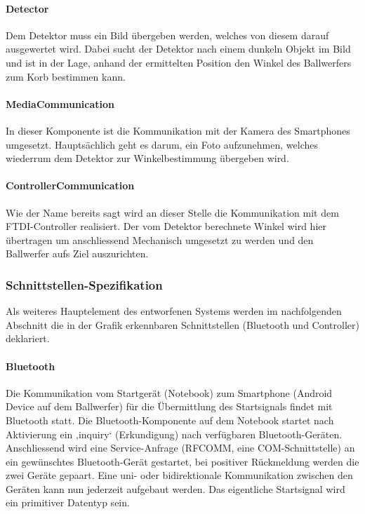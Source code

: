 		\paragraph{Detector}
		Dem Detektor muss ein Bild übergeben werden, welches von diesem darauf ausgewertet wird. Dabei sucht der Detektor nach einem dunkeln Objekt im Bild und ist in der Lage, anhand der ermittelten Position den Winkel des Ballwerfers zum Korb bestimmen kann.
		
		\paragraph{MediaCommunication}
		In dieser Komponente ist die Kommunikation mit der Kamera des Smartphones umgesetzt. Hauptsächlich geht es darum, ein Foto aufzunehmen, welches wiederrum dem Detektor zur Winkelbestimmung übergeben wird.
		
		\paragraph{ControllerCommunication}
		Wie der Name bereits sagt wird an dieser Stelle die Kommunikation mit dem FTDI-Controller realisiert. Der vom Detektor berechnete Winkel wird hier übertragen um anschliessend Mechanisch umgesetzt zu werden und den Ballwerfer aufs Ziel auszurichten.
		
	\subsubsection{Schnittstellen-Spezifikation}
		Als weiteres Hauptelement des entworfenen Systems werden im nachfolgenden Abschnitt die in der Grafik erkennbaren Schnittstellen (Bluetooth und Controller) deklariert.
		
		\paragraph{Bluetooth}
		Die Kommunikation vom Startgerät (Notebook) zum Smartphone (Android Device auf dem Ballwerfer) für die Übermittlung des Startsignals findet mit Bluetooth statt. Die Bluetooth-Komponente auf dem Notebook startet nach Aktivierung ein ‚inquiry‘ (Erkundigung) nach verfügbaren Bluetooth-Geräten. Anschliessend wird eine Service-Anfrage (RFCOMM, eine COM-Schnittstelle) an ein gewünschtes Bluetooth-Gerät gestartet, bei positiver Rückmeldung werden die zwei Geräte gepaart. Eine uni- oder bidirektionale Kommunikation zwischen den Geräten kann nun jederzeit aufgebaut werden. Das eigentliche Startsignal wird ein primitiver Datentyp sein.
		
